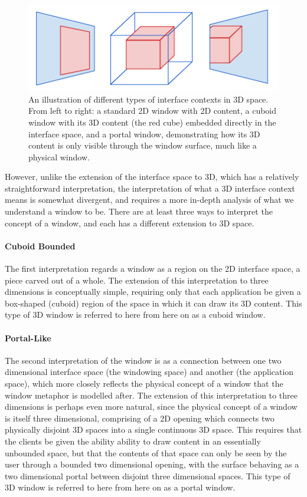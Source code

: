\begin{figure}[ht!]
\centering
\includegraphics[width=1.0\textwidth]{images/window-types.png}
\caption{An illustration of different types of interface contexts in 3D space. From left to right: a standard 2D window with 2D content, a cuboid window with its 3D content (the red cube) embedded directly in the interface space, and a portal window, demonstrating how its 3D content is only visible through the window surface, much like a physical window.}
\end{figure}

However, unlike the extension of the interface space to 3D, which has a relatively straightforward interpretation, the interpretation of what a 3D interface context means is somewhat divergent, and requires a more in-depth analysis of what we understand a window to be. There are at least three ways to interpret the concept of a window, and each has a different extension to 3D space.

\paragraph{Cuboid Bounded}

The first interpretation regards a window as a region on the 2D interface space, a piece carved out of a whole. The extension of this interpretation to three dimensions is conceptually simple, requiring only that each application be given a box-shaped (cuboid) region of the space in which it can draw its 3D content. This type of 3D window is referred to here from here on as a cuboid window.

\paragraph{Portal-Like}

The second interpretation of the window is as a connection between one two dimensional interface space (the windowing space) and another (the application space), which more closely reflects the physical concept of a window that the window metaphor is modelled after. The extension of this interpretation to three dimensions is perhaps even more natural, since the physical concept of a window is itself three dimensional, comprising of a 2D opening which connects two physically disjoint 3D spaces into a single continuous 3D space. This requires that the clients be given the ability ability to draw content in an essentially unbounded space, but that the contents of that space can only be seen by the user through a bounded two dimensional opening, with the surface behaving as a two dimensional portal between disjoint three dimensional spaces. This type of 3D window is referred to here from here on as a portal window.


